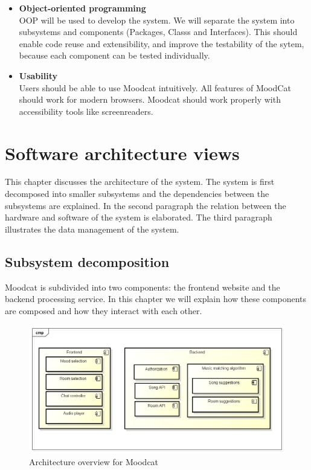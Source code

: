 \begin{itemize}
\item
\textbf{Object-oriented programming}
\\
\gls{OOP}\cite{Wirfs-Brock} will be used to develop the system.
We will separate the system into subsystems and components (\glspl{Package}, \glspl{Class} and \glspl{Interface}).
This should enable code reuse and extensibility, and improve the testability of the sytem, because each component can be tested individually\cite{Binder}.

\item
\textbf{Usability}
\\
Users should be able to use Moodcat intuitively.
All features of MoodCat should work for modern browsers.
Moodcat should work properly with accessibility tools like screenreaders.

\end{itemize}

\chapter{Software architecture views}
This chapter discusses the architecture of the system.
The system is first decomposed into smaller subsystems and the dependencies between the subsystems are explained.
In the second paragraph the relation between the hardware and software of the system is elaborated.
The third paragraph illustrates the data management of the system.

\section{Subsystem decomposition}
Moodcat is subdivided into two components: the frontend website and the backend processing service.
In this chapter we will explain how these components are composed and how they interact with each other.

\begin{figure}[H]
\includegraphics[scale=.6]{architectureOverview.png}
\caption{Architecture overview for Moodcat}
\label{fig:architectureOverview}
\end{figure}

